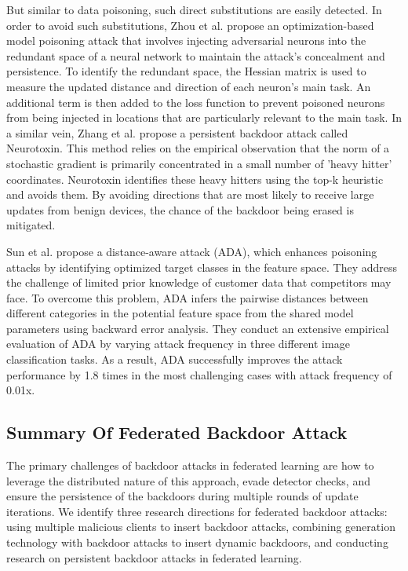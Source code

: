 \documentclass[conference]{IEEEtran}
\begin{document}
But similar to data poisoning, such direct substitutions are easily detected.
In order to avoid such substitutions,
Zhou et al.\cite{b63} propose an optimization-based model poisoning attack that
involves injecting adversarial neurons into the redundant space of a neural network
to maintain the attack's concealment and persistence. To identify the redundant
space, the Hessian matrix is used to measure the updated distance and direction of each neuron's main task.
An additional term is then added to the loss function to prevent poisoned neurons from being injected
in locations that are particularly relevant to the main task.
In a similar vein, Zhang et al.\cite{b62}
propose a persistent backdoor attack called Neurotoxin. This method
relies on the empirical observation that the norm of a stochastic gradient
is primarily concentrated in a small number of 'heavy hitter' coordinates.
Neurotoxin identifies these heavy hitters using the top-k heuristic and
avoids them. By avoiding directions that are most likely to receive large
updates from benign devices, the chance of the backdoor being erased is mitigated.

Sun et al. \cite{b65}propose a distance-aware attack (ADA), which enhances poisoning attacks
by identifying optimized target classes in the feature space. They address the challenge of
limited prior knowledge of customer data that competitors may face. To overcome this problem,
ADA infers the pairwise distances between different categories in the potential feature space
from the shared model parameters using backward error analysis. They conduct an extensive
empirical evaluation of ADA by varying attack frequency in three different image classification
tasks. As a result, ADA successfully improves the attack performance by 1.8 times in the most
challenging cases with attack frequency of 0.01x.

\subsection{Summary Of Federated Backdoor Attack}
The primary challenges of backdoor attacks in federated learning are how
to leverage the distributed nature of this approach, evade detector checks,
and ensure the persistence of the backdoors during multiple rounds of update
iterations. We identify three research directions for federated backdoor
attacks: using multiple malicious clients to insert backdoor attacks,
combining generation technology with backdoor attacks to insert dynamic backdoors, and conducting
research on persistent backdoor attacks in federated learning.
\end{document}
